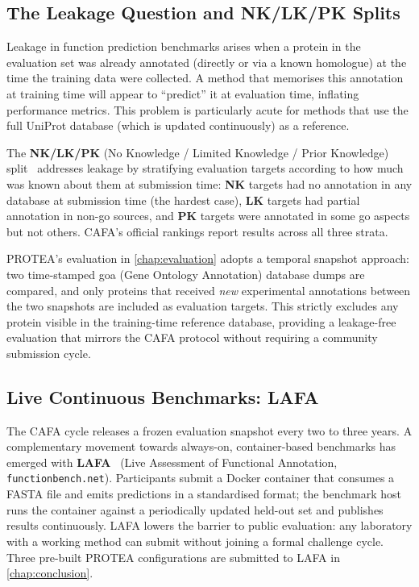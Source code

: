 \subsection{The Leakage Question and NK/LK/PK Splits}
\label{subsec:related-leakage}

Leakage in function prediction benchmarks arises when a protein in the evaluation
set was already annotated (directly or via a known homologue) at the time the
training data were collected. A method that memorises this annotation at
training time will appear to ``predict'' it at evaluation time, inflating
performance metrics. This problem is particularly acute for methods that use the
full UniProt database (which is updated continuously) as a reference.

The \textbf{NK/LK/PK} (No Knowledge / Limited Knowledge / Prior Knowledge)
split~\cite{radivojac2013cafa1} addresses leakage by stratifying evaluation
targets according to how much was known about them at submission time:
\textbf{NK} targets had no annotation in any database at submission time (the
hardest case), \textbf{LK} targets had partial annotation in non-\gls{go} sources,
and \textbf{PK} targets were annotated in some \gls{go} aspects but not others.
CAFA's official rankings report results across all three strata.

PROTEA's evaluation in \cref{chap:evaluation} adopts a temporal snapshot
approach: two time-stamped \gls{goa} (Gene Ontology Annotation) database dumps
are compared, and only proteins that received \textit{new} experimental
annotations between the two snapshots are included as evaluation targets. This
strictly excludes any protein visible in the training-time reference database,
providing a leakage-free evaluation that mirrors the CAFA protocol without
requiring a community submission cycle.

\subsection{Live Continuous Benchmarks: LAFA}
\label{subsec:related-lafa}

The CAFA cycle releases a frozen evaluation snapshot every two to three years.
A complementary movement towards always-on, container-based benchmarks has
emerged with \textbf{LAFA}~\cite{lafa2024} (Live Assessment of Functional
Annotation, \texttt{functionbench.net}). Participants submit a Docker
container that consumes a FASTA file and emits predictions in a standardised
format; the benchmark host runs the container against a periodically updated
held-out set and publishes results continuously. LAFA lowers the barrier to
public evaluation: any laboratory with a working method can submit without joining
a formal challenge cycle. Three pre-built PROTEA configurations are submitted to
LAFA in \cref{chap:conclusion}.


